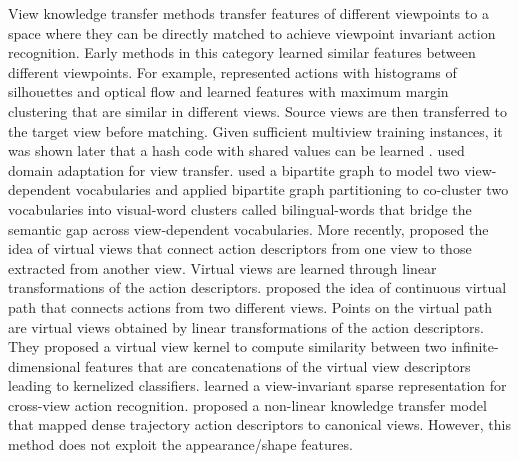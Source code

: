 \documentclass[twocolumn]{svjour3}          \smartqed  \usepackage{graphicx}
\begin{document}
View knowledge transfer methods transfer features of different viewpoints to a space where they can be directly matched to achieve viewpoint invariant action recognition. Early methods in this category learned similar features between different viewpoints. For example, \citet{farhadi2008learning} represented actions with histograms of silhouettes and optical flow and  learned features with maximum margin clustering that are similar in different views. Source views are then transferred to the target view before matching. Given sufficient multiview training instances, it was shown later that a hash code with shared values can be learned \citep{farhadi2009latent}. \citet{gopalan2011domain} used domain adaptation for view transfer. \citet{liu2011cross} used a bipartite graph to model two view-dependent vocabularies and applied bipartite graph partitioning to co-cluster two vocabularies into visual-word clusters called bilingual-words that bridge the semantic gap across view-dependent vocabularies. More recently, \citet{DVV} proposed the idea of virtual views that connect action descriptors from one view to those extracted from another view. Virtual views are learned through linear transformations of the action descriptors. \citet{CVP} proposed the idea of continuous virtual path that connects actions from two different views. Points on the virtual path are virtual views obtained by linear transformations of the action descriptors. They proposed a virtual view kernel to compute similarity between two infinite-dimensional features that are concatenations of the virtual view descriptors leading to kernelized classifiers. \citet{zheng2013learning} learned a view-invariant sparse representation for cross-view action recognition. \citet{NKTM} proposed a non-linear knowledge transfer model that mapped dense trajectory action descriptors to canonical views. However, this method does not exploit the appearance/shape features.
\end{document}
